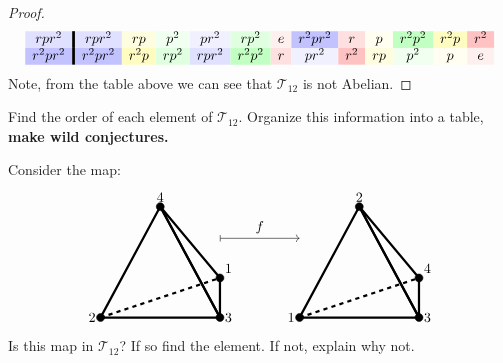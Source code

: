 \documentclass{ximera}
\begin{document}
\begin{example}
\begin{proof}
\begin{gather*}
\begin{array}{c!{\vline width 2pt}cccccccccccc}
      rpr^2\cellcolor{blue!12!white}    & rpr^2\cellcolor{blue!12!white} & rp\cellcolor{yellow!12!white} & p^2\cellcolor{green!6!white} & pr^2\cellcolor{blue!6!white} & rp^2\cellcolor{green!12!white}& e\cellcolor{red!6!white} & r^2pr^2\cellcolor{blue!24!white} & r\cellcolor{red!12!white}  &  p \cellcolor{yellow!6!white}  & r^2p^2 \cellcolor{green!24!white}  &  r^2p \cellcolor{yellow!24!white}  & r^2 \cellcolor{red!24!white}\\
      r^2pr^2\cellcolor{blue!24!white}  & r^2pr^2\cellcolor{blue!24!white}& r^2p\cellcolor{yellow!24!white} & rp^2\cellcolor{green!12!white} & rpr^2\cellcolor{blue!12!white} & r^2p^2\cellcolor{green!24!white}& r\cellcolor{red!12!white} & pr^2\cellcolor{blue!6!white} & r^2\cellcolor{red!24!white}  &  rp \cellcolor{yellow!12!white}  & p^2 \cellcolor{green!6!white}  &  p \cellcolor{yellow!6!white}  & e \cellcolor{red!6!white}\\
    \end{array}
    \end{gather*}
    Note, from the table above we can see that $\mathcal{T}_{12}$ is not Abelian.
  \end{proof}
\end{example}



\begin{exercise}
  Find the order of each element of $\mathcal{T}_{12}$. Organize this
  information into a table, \textbf{make wild conjectures.}
\end{exercise}


\begin{exercise}
  Consider the map:
  \[
  \begin{tikzpicture}
  \draw[ultra thick,rounded corners=.05mm] (0,0) -- (3,0) -- (1.5,2.8) -- cycle;
  \draw[ultra thick,rounded corners=.05mm] (3,1) -- (3,0) -- (1.5,2.8) -- cycle;
  \draw[ultra thick,dashed] (0,0) -- (3,1);
  \draw[fill] (3,1) circle (1mm) node[above right] {$1$};
  \draw[fill] (0,0) circle (1mm) node[left] {$2$};
  \draw[fill] (3,0) circle (1mm) node[right] {$3$};
  \draw[fill] (1.5,2.8) circle (1mm) node[above] {$4$};

  \draw[|->] (3,2) -- (5,2);
  \node[above] at (4,2) {$f$};
  
  \draw[ultra thick,rounded corners=.05mm] (5,0) -- (8,0) -- (6.5,2.8) -- cycle;
  \draw[ultra thick,rounded corners=.05mm] (8,1) -- (8,0) -- (6.5,2.8) -- cycle;
  \draw[ultra thick,dashed] (5,0) -- (8,1);
  \draw[fill] (8,1) circle (1mm) node[above right] {$4$};
  \draw[fill] (5,0) circle (1mm) node[left] {$1$};
  \draw[fill] (8,0) circle (1mm) node[right] {$3$};
  \draw[fill] (6.5,2.8) circle (1mm) node[above] {$2$};
  \end{tikzpicture}
  \]
  Is this map in $\mathcal{T}_{12}$? If so find the element. If not, explain why
  not.
\end{exercise}
\end{document}
